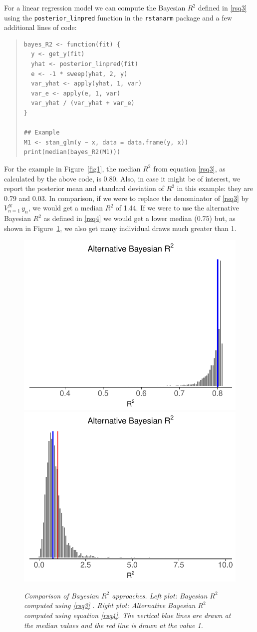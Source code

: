 \documentclass[11pt]{article}
\begin{document}
For a linear regression model we can compute the Bayesian $R^2$ defined in
\eqref{rsq3} using the \verb#posterior_linpred# function in the {\tt rstanarm}
package and a few additional lines of code:
%
\vspace{-\baselineskip}
\begin{quotation}
\noindent
\begin{small}
\begin{verbatim}
bayes_R2 <- function(fit) {
  y <- get_y(fit)
  yhat <- posterior_linpred(fit)
  e <- -1 * sweep(yhat, 2, y)
  var_yhat <- apply(yhat, 1, var)
  var_e <- apply(e, 1, var)
  var_yhat / (var_yhat + var_e)
}

## Example
M1 <- stan_glm(y ~ x, data = data.frame(y, x))
print(median(bayes_R2(M1)))
\end{verbatim}
\end{small}
\end{quotation}
%
For the example in Figure~\ref{fig1}, the median $R^2$ from
equation \eqref{rsq3}, as calculated by the above code, is 0.80.  
Also, in case it might be of interest, we report the posterior mean and 
standard deviation of $R^2$ in this example: they are 0.79 and 0.03.
In comparison, if we were to replace the denominator of 
\eqref{rsq3} by $V_{n=1}^N \,y_n$, we would get a median $R^2$ of 1.44. 
If we were to use the alternative Bayesian $R^2$ as defined in \eqref{rsq4}
we would get a lower median (0.75) but, as shown in Figure~\ref{fig2}, 
we also get many individual draws much greater than 1.

\begin{figure}
\centerline{\includegraphics[width=.5\textwidth]{fig/rsquared2a-gg.pdf}\includegraphics[width=.5\textwidth]{fig/rsquared2b-gg.pdf}}
\vspace{-.1in}
\caption{\it 
Comparison of Bayesian $R^2$ approaches. 
{\em Left plot:} Bayesian $R^2$ computed using \eqref{rsq3} . 
{\em Right plot:}  Alternative Bayesian $R^2$ computed using equation \eqref{rsq4}. 
The vertical blue lines are drawn at the median values and the red line is drawn at the value 1.
}
\label{fig2}
\end{figure}
\end{document}
